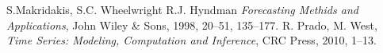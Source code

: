 \documentclass[a4paper,11pt,twoside]{report}
\theoremstyle{definition}
\begin{document}
\thispagestyle{empty}






\begin{thebibliography}{20} %

 S.Makridakis, S.C. Wheelwright R.J. Hyndman \emph{Forecasting Methids and Applications}, John Wiley \& Sons, 1998, 20--51, 135--177.
 R. Prado, M. West,  \emph{Time Series: Modeling, Computation and Inference}, CRC Press, 2010, 1--13.

\end{thebibliography}
\thispagestyle{empty}



\end{document}
